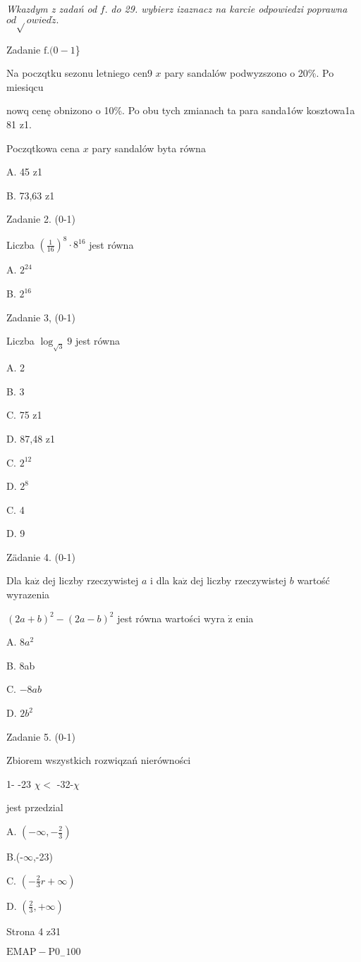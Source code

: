\documentclass[a4paper,12pt]{article}
\begin{document}
{\it Wkazdym z zadań od} $f.$ {\it do 29. wybierz izaznacz na karcie odpowiedzi poprawna} $od\sqrt{}owi\mathrm{e}d\acute{z}.$

Zadanie $\mathrm{f}. (0-1$\}

Na poczqtku sezonu letniego cen9 $x$ pary sandalów podwyzszono o 20\%. Po miesiqcu

nowq cenę obnizono o 10\%. Po obu tych zmianach ta para sanda1ów kosztowa1a 81 z1.

Poczqtkowa cena $x$ pary sandalów byta równa

A. 45 z1

B. 73,63 z1

Zadanie 2. (0-1)

Liczba $(\displaystyle \frac{1}{16})^{8}\cdot 8^{16}$ jest równa

A. $2^{24}$

B. $2^{16}$

Zadanie 3, (0-1)

Liczba $\log_{\sqrt{3}}9$ jest równa

A. 2

B. 3

C. 75 z1

D. 87,48 z1

C. $2^{12}$

D. $2^{8}$

C. 4

D. 9

Zädanie 4. (0-1)

Dla $\mathrm{k}\mathrm{a}\dot{\mathrm{z}}$ dej liczby rzeczywistej $a$ i dla $\mathrm{k}\mathrm{a}\dot{\mathrm{z}}$ dej liczby rzeczywistej $b$ wartość wyrazenia

$(2a+b)^{2}-(2a-b)^{2}$ jest równa wartości wyra $\dot{\mathrm{z}}$ enia

A. $8a^{2}$

B. 8ab

C. $-8ab$

D. $2b^{2}$

Zadanie 5. (0-1)

Zbiorem wszystkich rozwiqzań nierówności

1- -23 $\chi<$ -32-$\chi$

jest przedzial

A. $(-\displaystyle \infty,-\frac{2}{3})$

B.(-$\infty$,-23)

C. $(-\displaystyle \frac{2}{3}r+\infty)$

D. $(\displaystyle \frac{2}{3},+\infty)$

Strona 4 z31

$\mathrm{E}\mathrm{M}\mathrm{A}\mathrm{P}-\mathrm{P}0_{-}100$
\end{document}
